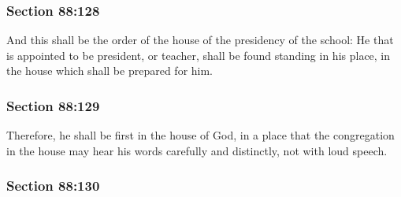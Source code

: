 
	\subsubsection{Section 88:128} %
		\label{DC88-128}

		And this shall be the order of the house of the presidency of the school: He that is appointed to be president, or teacher, shall be found standing in his place, in the house which shall be prepared for him.


	\subsubsection{Section 88:129} %
		\label{DC88-129}

		Therefore, he shall be first in the house of God, in a place that the congregation in the house may hear his words carefully and distinctly, not with loud speech.


	\subsubsection{Section 88:130} %
		\label{DC88-130}

